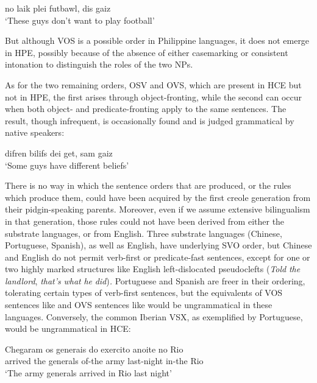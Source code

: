 

\ea\label{ex:27}
 no laik plei futbawl, dis gaiz\\
\glt  `These guys don't want to play football'
\z

\noindent But although VOS is a possible order in Philippine languages, it does not emerge in HPE, possibly because of the absence of either case\-marking or consistent intonation to distinguish the roles of the two NPs.

As for the two remaining orders, OSV and OVS, which are present in HCE but not in HPE, the first arises through object-fronting, while the second can occur when both object- and predicate-fronting apply to the same sentences. The result, though infrequent, is occasion\-ally found and is judged grammatical by native speakers:

\ea\label{ex:28}
 difren bilifs dei get, sam gaiz \\
\glt  `Some guys have different beliefs'
\z

There is no way in which the sentence orders that are produced, or the rules which produce them, could have been acquired by the first creole generation from their pidgin-speaking parents. Moreover, even if we assume extensive bilingualism in that generation, those rules could not have been derived from either the substrate languages, or from English. Three substrate languages (Chinese, Portuguese, Spanish), as well as English, have underlying SVO order, but Chinese and English do not permit verb-first or predicate-fast sentences, except for one or two highly marked structures like English left-dislocated pseudo\-clefts (\textit{Told} \textit{the} \textit{landlord}, \textit{that's} \textit{what} \textit{he} \textit{did})\textit{.} Portuguese and Spanish are freer in their ordering, tolerating certain types of verb-first sen\-tences, but the equivalents of VOS sentences like  and OVS sen\-tences like  would be ungrammatical in these languages. Conversely, the common Iberian VSX, as exemplified by Portuguese, would be ungrammatical in HCE:

\ea\label{ex:29}
 \gll Chegaram os generais do exercito anoite no Rio\\ 
	  arrived the generals of-the army last-night in-the Rio\\
 \glt `The army generals arrived in Rio last night'
\glt 
\z
{}

